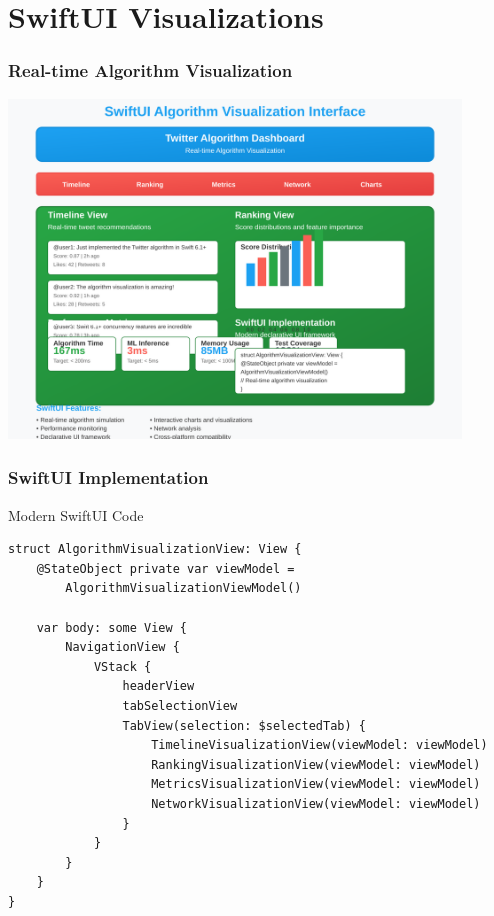 \documentclass[aspectratio=169]{beamer}
\begin{document}
\section{SwiftUI Visualizations}

\begin{frame}
    \frametitle{Real-time Algorithm Visualization}
    \begin{center}
        \includegraphics[width=0.9\textwidth]{images/swiftui-interface.svg}
    \end{center}
\end{frame}

\begin{frame}
    \frametitle{SwiftUI Implementation}
    \begin{block}{Modern SwiftUI Code}
        \begin{verbatim}
struct AlgorithmVisualizationView: View {
    @StateObject private var viewModel = 
        AlgorithmVisualizationViewModel()
    
    var body: some View {
        NavigationView {
            VStack {
                headerView
                tabSelectionView
                TabView(selection: $selectedTab) {
                    TimelineVisualizationView(viewModel: viewModel)
                    RankingVisualizationView(viewModel: viewModel)
                    MetricsVisualizationView(viewModel: viewModel)
                    NetworkVisualizationView(viewModel: viewModel)
                }
            }
        }
    }
}
        \end{verbatim}
    \end{block}
\end{frame}
\end{document}
